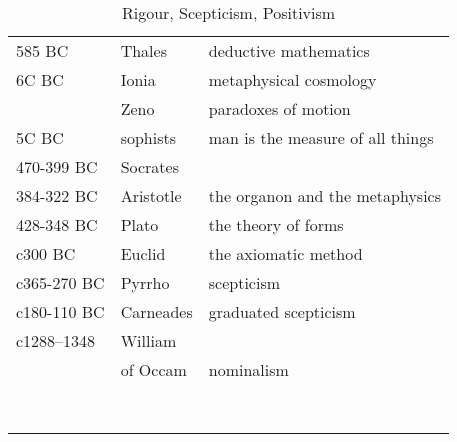 \begin{table}[h]
\begin{center}
\begin{tabular}{|l l p{5cm}|}
\hline
585 BC & Thales & deductive mathematics \\
6C BC & Ionia & metaphysical cosmology \\
 & Zeno & paradoxes of motion \\
5C BC & sophists & man is the measure of all things \\
470-399 BC & Socrates & \\
384-322 BC & Aristotle & the organon and the metaphysics \\
428-348 BC & Plato & the theory of forms \\

c300 BC & Euclid & the axiomatic method \\
c365-270 BC & Pyrrho & scepticism \\
c180-110 BC & Carneades & graduated scepticism \\
c1288–1348 & William & \\
& of Occam & nominalism \\
 &  & \\
 &  & \\
 &  & \\
 &  & \\
 &  & \\
 &  & \\
 &  & \\
 &  & \\
\hline
\end{tabular}
\caption{Rigour, Scepticism, Positivism}
\label{tab:RigourScepticismPositivism}
\end{center}
\end{table}